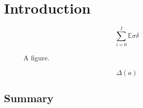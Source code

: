 \chapter{Introduction}
\blindtext
$$
\sum\limits_{i=0}^I \mathbb{E}\sigma \delta
$$

\begin{figure}
  \centering
  \caption{A figure.}
  
  \label{}
\end{figure}

$$
\Delta(a)
$$

\section{Summary}
